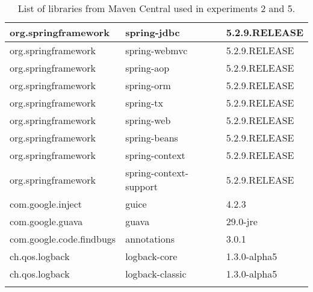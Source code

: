 \begin{appendices}
\begin{longtable}[h]{|l|l|l|}
  org.springframework & spring-jdbc & 5.2.9.RELEASE \\ \hline
  org.springframework & spring-webmvc & 5.2.9.RELEASE \\ \hline
  org.springframework & spring-aop & 5.2.9.RELEASE \\ \hline
  org.springframework & spring-orm & 5.2.9.RELEASE \\ \hline
  org.springframework & spring-tx & 5.2.9.RELEASE \\ \hline
  org.springframework & spring-web & 5.2.9.RELEASE \\ \hline
  org.springframework & spring-beans & 5.2.9.RELEASE \\ \hline
  org.springframework & spring-context & 5.2.9.RELEASE \\ \hline
  org.springframework & spring-context-support & 5.2.9.RELEASE \\ \hline
  com.google.inject & guice & 4.2.3 \\ \hline
  com.google.guava & guava & 29.0-jre \\ \hline
  com.google.code.findbugs & annotations & 3.0.1 \\ \hline
  ch.qos.logback & logback-core & 1.3.0-alpha5 \\ \hline
  ch.qos.logback & logback-classic & 1.3.0-alpha5 \\ \hline
  \caption{List of libraries from Maven Central used in experiments 2 and 5.}
  \label{table:data-set}
\end{longtable}

\end{appendices}
